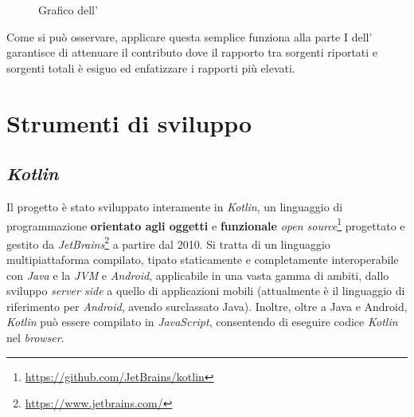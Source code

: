 \begin{figure}[h!]
	\centering
	\caption{Grafico dell'}
	\label{graph:weight-function}
\end{figure}

Come si può osservare, applicare questa semplice funziona alla parte I dell' garantisce di attenuare il contributo dove il rapporto tra sorgenti riportati e sorgenti totali è esiguo ed enfatizzare i rapporti più elevati. 


\section{Strumenti di sviluppo}

\subsection*{\textit{Kotlin}}
Il progetto è stato sviluppato interamente in \textit{Kotlin}, un linguaggio di programmazione \textbf{orientato agli oggetti} e \textbf{funzionale} \textit{open source}\footnote{\url{https://github.com/JetBrains/kotlin}} progettato e gestito da \textit{JetBrains}\footnote{\url{https://www.jetbrains.com/}} a partire dal 2010.
%
Si tratta di un linguaggio multipiattaforma compilato, tipato staticamente e  completamente interoperabile con \textit{Java} e la \textit{JVM} e \textit{Android}, applicabile in una vasta gamma di ambiti, dallo sviluppo \textit{server side} a quello di applicazioni mobili (attualmente è il linguaggio di riferimento per \textit{Android}, avendo surclassato Java).
%
Inoltre, oltre a Java e Android, \textit{Kotlin} può essere compilato in \textit{JavaScript}, consentendo di eseguire codice \textit{Kotlin} nel \textit{browser}.

